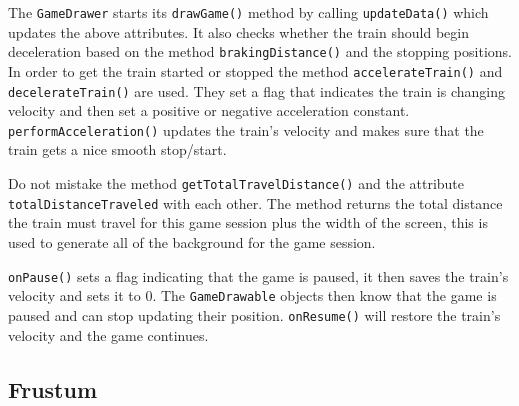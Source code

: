 \begin{description}
The \lstinline|GameDrawer| starts its \lstinline|drawGame()| method by calling \lstinline|updateData()| which updates the above attributes. It also checks whether the train should begin deceleration based on the method \lstinline|brakingDistance()| and the stopping positions. In order to get the train started or stopped the method \lstinline|accelerateTrain()| and \lstinline|decelerateTrain()| are used. They set a flag that indicates the train is changing velocity and then set a positive or negative acceleration constant. \linebreak \lstinline|performAcceleration()| updates the train's velocity and makes sure that the train gets a nice smooth stop/start.

Do not mistake the method \lstinline|getTotalTravelDistance()| and the attribute \linebreak \lstinline|totalDistanceTraveled| with each other. The method returns the total distance the train must travel for this game session plus the width of the screen, this is used to generate all of the background for the game session.

\lstinline|onPause()| sets a flag indicating that the game is paused, it then saves the train's velocity and sets it to 0. The \lstinline|GameDrawable| objects then know that the game is paused and can stop updating their position. \lstinline|onResume()| will restore the train's velocity and the game continues.

\end{description}

\subsection{Frustum}\label{sec:frustum}

